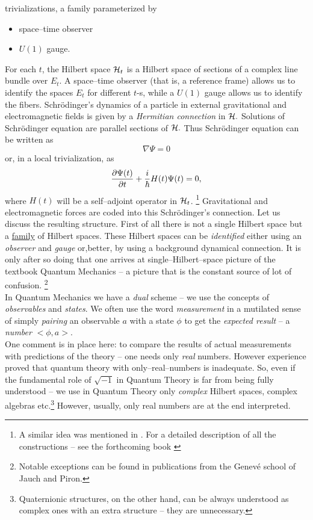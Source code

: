 \documentclass[12pt]{article}
\def\be{\begin{equation}} \def\ee{\end{equation}}
\begin{document}
trivializations,  a family parameterized by 
\begin{itemize}
\item  space--time observer 
\item $U (1)$ gauge.
\end{itemize}
For each $t$, the Hilbert space ${\cal H}_t$ is a Hilbert space
of sections of a complex line bundle over $E_t$. A space--time observer
(that is, a reference frame)
allows us to identify the spaces $E_t$ for different $t$-s, while
a $U(1)$ gauge allows us to identify the fibers.
Schr\"odinger's dynamics of a particle in external gravitational and
electromagnetic
fields
is given by a {\sl Hermitian connection} in ${\cal H}. $ Solutions of
Schr\"odinger
equation are parallel sections of ${\cal H}. $ Thus Schr\"odinger equation
can be written
as \be
\nabla \Psi = 0 \ee
or,  in a local trivialization,  as \be
{\frac{{\partial \Psi  (t)}}{{\partial t}}} + 
{i\over\hbar}H (t)\Psi  (t) =
0,  \ee
where $H (t)$ will be a self--adjoint operator in ${\cal H}_t$. 
\footnote{A similar idea was mentioned in \cite{aso}.  For a detailed
description of all the constructions -- see the forthcoming book \cite{jamo}}
Gravitational and electromagnetic forces are
coded into this Schr\"odinger's connection. 
Let us discuss the resulting structure.  First of all
there is not a single  Hilbert space but a
\underline{family} of Hilbert spaces. 
These Hilbert spaces can be {\sl identified} either using an
{\sl observer}  and
{\sl gauge}  or,better, by using a background dynamical connection.
It is only after so doing 
that one arrives at
single--Hilbert--space picture of the textbook Quantum Mechanics --
a picture that
is the constant source of lot of confusion. \footnote{Notable
exceptions can be found in  publications from the
Genev\'e school of Jauch and Piron. }\\ 
In Quantum Mechanics we have a {\sl dual}
scheme -- we use the concepts of {\sl observables} and {\sl states}.  We often
use the word {\sl measurement} in a mutilated sense of simply {\sl pairing}
an observable $a$ with a state $\phi $ to get the {\sl expected result} -- 
a {\sl number} $
<\phi , a>. $ \\ One comment is in place here:  to compare the results of actual
measurements with predictions of the theory -- one needs only {\sl real}
numbers.  However experience proved that quantum theory with
only--real--numbers is inadequate.  So,  even if the fundamental role of
$\sqrt{-1}$ in Quantum Theory is far from being fully understood --
we use in Quantum Theory only {\sl complex} Hilbert spaces,  complex algebras
etc.\footnote{Quaternionic  structures,  on the other hand,  can be always 
understood as complex
ones with an extra structure -- they are unnecessary.  } 
However,  usually,  only real numbers are at the end interpreted.  
 
\end{document}
